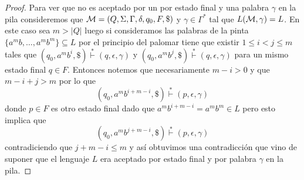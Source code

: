 \documentclass[tesis.tex]{subfiles}
\begin{document}
\begin{proof}
		
		
%		
%		
%		
		
		Para ver que no es aceptado por un \APD por estado final y una palabra $\gamma$ en la pila consideremos que ${\cal M} = (Q,\Sigma, \Gamma, \delta, q_0, F, \$)$ \APD y $\gamma \in \Gamma^{*}$ tal que $L({\cal M}, \gamma) = L$.
		En este caso sea $m > |Q|$ luego si consideramos las palabras de la pinta $\{ a^mb, \dots, a^mb^m  \} \subseteq L$ por el principio del palomar tiene que existir $1 \le i < j \le m$ tales que $(q_{0},a^mb^i, \$) \overset{*}{\vdash} (q,\epsilon,\gamma)$ y $(q_{0},a^mb^j, \$) \overset{*}{\vdash} (q,\epsilon,\gamma)$ para un mismo estado final $q \in F$.
		Entonces notemos que necesariamente $m - i > 0$ y que $m-i+j > m$ por lo que
		\[
			(q_{0},a^mb^{i+m-i}, \$) \overset{*}{\vdash} (p,\epsilon,\gamma)
		\]
		donde $p \in F$ es otro estado final dado que $a^mb^{i+m-i} = a^mb^m \in L$ pero esto implica que 
		\[
		(q_{0},a^mb^{j+m-i}, \$) \overset{*}{\vdash} (p,\epsilon,\gamma)
		\]
		contradiciendo que $j+m-i \le m$ y así obtuvimos una contradicción que vino de suponer que el lenguaje $L$ era aceptado por estado final y por palabra $\gamma$ en la pila.
	
\end{proof}



\end{document}

